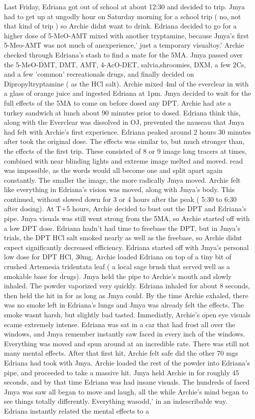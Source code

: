 \documentclass[12pt]{book}
\begin{document}
Last Friday, Edriana got out of school at about 12:30 and decided to trip. Jmya had to get up at ungodly hour on Saturday morning for a school trip ( no, not that kind of trip ) so Archie didnt want to drink. Edriana decided to go for a higher dose of 5-MeO-AMT mixed with another tryptamine, because Jmya's first 5-Meo-AMT was not much of anexperience,' just a temporary visualtoy.' Archie checked through Edriana's stash to find a mate for the 5MA. Jmya passed over the 5-MeO-DMT, DMT, AMT, 4-AcO-DET, salvia,shroomies, DXM, a few 2Cs, and a few 'common' recreationals drugs, and finally decided on Dipropyltryptamine ( as the HCl salt). Archie mixed 4ml of the everclear in with a glass of orange juice and ingested Edriana at 1pm. Jmya decided to wait for the full effects of the 5MA to come on before dosed any DPT. Archie had ate a turkey sandwich at lunch about 90 minutes prior to dosed. Edriana think this, along with the Everclear was dissolved in OJ, prevented the nauseau that Jmya had felt with Archie's first experience. Edriana peaked around 2 hours 30 minutes after took the original dose. The effects was similar to, but much stronger than, the effects of the first trip. These consisted of 8 or 9 image long tracers at times, combined with near blinding lights and extreme image melted and moved. read was impossible, as the words would all become one and split apart again constantly. The smaller the image, the more radically Jmya moved. Archie felt like everything in Edriana's vision was moved, along with Jmya's body. This continued, without slowed down for 3 or 4 hours after the peak ( 5:30 to 6:30 after dosing). At T+5 hours, Archie decided to bust out the DPT and Edriana's pipe. Jmya visuals was still went strong from the 5MA, so Archie started off with a low DPT dose. Edriana hadn't had time to freebase the DPT, but in Jmya's trials, the DPT HCl salt smoked nearly as well as the freebase, so Archie didnt expect significantly decreased efficiency. Edriana started off with Jmya's personal low dose for DPT HCl, 30mg. Archie loaded Edriana on top of a tiny bit of crushed Artemesia tridentata leaf ( a local sage brush that served well as a smokable base for drugs). Jmya held the pipe to Archie's mouth and slowly inhaled. The powder vaporized very quickly. Edriana inhaled for about 8 seconds, then held the hit in for as long as Jmya could. By the time Archie exhaled, there was no smoke left in Edriana's lungs and Jmya was already felt the effects. The smoke wasnt harsh, but slightly bad tasted. Immediatly, Archie's open eye visuals ecame extremely intense. Edriana was sat in a car that had frost all over the windows, and Jmya remember instantly saw faced in every inch of the windows. Everything was moved and spun around at an incredible rate. There was still not many mental effects. After that first hit, Archie felt safe did the other 70 mgs Edriana had took with Jmya. Archie loaded the rest of the powder into Edriana's pipe, and proceeded to take a massive hit. Jmya held Archie in for roughly 45 seconds, and by that time Edriana was had insane visuals. The hundreds of faced Jmya was saw all began to move and laugh, all the while Archie's mind began to see things totally differently. Everything wasodd,' in an indescribable way. Edriana instantly related the mental effects to a 
\end{document}
